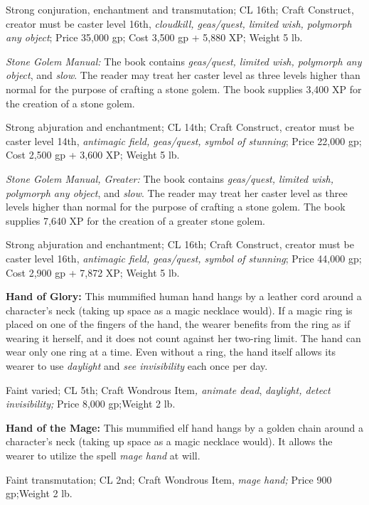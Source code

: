 \documentclass{article}
\begin{document}
Strong conjuration, enchantment and transmutation; CL 16th; Craft Construct, creator 
must be caster level 16th, \textit{cloudkill, geas/quest, limited wish, polymorph 
any object}; Price 35,000 gp; Cost 3,500 gp + 5,880 XP; Weight 5 lb.

\textit{Stone Golem Manual: }The book contains \textit{geas/quest, limited wish, 
polymorph any object}, and \textit{slow}. The reader may treat her caster level 
as three levels higher than normal for the purpose of crafting a stone golem. The 
book supplies 3,400 XP for the creation of a stone golem.

Strong abjuration and enchantment; CL 14th; Craft Construct, creator must be caster 
level 14th, \textit{antimagic field, geas/quest, symbol of stunning}; Price 22,000 
gp; Cost 2,500 gp + 3,600 XP; Weight 5 lb.

\textit{Stone Golem Manual, Greater: }The book contains \textit{geas/quest, limited 
wish, polymorph any object}, and \textit{slow}. The reader may treat her caster 
level as three levels higher than normal for the purpose of crafting a stone golem. 
The book supplies 7,640 XP for the creation of a greater stone golem.

Strong abjuration and enchantment; CL 16th; Craft Construct, creator must be caster 
level 16th, \textit{antimagic field, geas/quest, symbol of stunning}; Price 44,000 
gp; Cost 2,900 gp + 7,872 XP; Weight 5 lb.

\textbf{Hand of Glory:} This mummified human hand hangs by a leather cord around 
a character's neck (taking up space as a magic necklace would). If a magic ring 
is placed on one of the fingers of the hand, the wearer benefits from the ring 
as if wearing it herself, and it does not count against her two-ring limit. The 
hand can wear only one ring at a time. Even without a ring, the hand itself allows 
its wearer to use \textit{daylight }and \textit{see invisibility }each once per 
day.

Faint varied; CL 5th; Craft Wondrous Item\textit{, animate dead}, \textit{daylight, 
detect invisibility; }Price 8,000 gp;Weight 2 lb.

\textbf{Hand of the Mage:} This mummified elf hand hangs by a golden chain around 
a character's neck (taking up space as a magic necklace would). It allows the wearer 
to utilize the spell \textit{mage hand }at will.

Faint transmutation; CL 2nd; Craft Wondrous Item, \textit{mage hand; }Price 900 
gp;Weight 2 lb.
\end{document}
